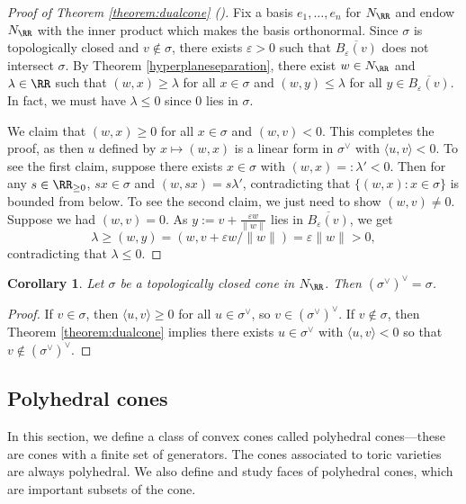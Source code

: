 \documentclass[12pt]{amsart}
\theoremstyle{plain}
\newtheorem{corollary}[theorem]{Corollary}
\theoremstyle{definition}
\begin{document}
\begin{proof}[Proof of Theorem \ref{theorem:dualcone} \textup{(\cite[Example 2.20]{BV04})}]
Fix a basis $e_1, \ldots, e_n$ for $N_\RR$ and endow $N_\RR$ with the inner product which makes the basis orthonormal.
Since $\sigma$ is topologically closed and $v \notin \sigma$, there exists $\varepsilon > 0$ such that $\overline{B_\varepsilon(v)}$ does not intersect $\sigma$.
By Theorem \ref{hyperplaneseparation}, there exist $w \in N_\RR$ and $\lambda \in \RR$ such that $(w, x) \ge \lambda$ for all $x \in \sigma$ and $(w, y) \le \lambda$ for all $y \in \overline{B_\varepsilon(v)}$.
In fact, we must have $\lambda \le 0$ since $0$ lies in $\sigma$.

We claim that $(w, x) \ge 0$ for all $x \in \sigma$ and $(w, v) < 0$.
This completes the proof, as then $u$ defined by $x \mapsto (w, x)$ is a linear form in $\sigma^\vee$ with $\langle u, v \rangle < 0$.
To see the first claim, suppose there exists $x \in \sigma$ with $(w, x) =: \lambda' < 0$.
Then for any $s \in \RR_{\ge 0}$, $s x \in \sigma $ and $(w, s x) = s \lambda'$, contradicting that $\{(w, x) : x \in \sigma\}$ is bounded from below.
To see the second claim, we just need to show $(w, v) \ne 0$.
Suppose we had $(w, v) = 0$.
As $y := v + \frac{\varepsilon w}{\|w\|}$ lies in $\overline{B_\varepsilon(v)}$, we get
$$\lambda \ge (w, y) = (w, v + \varepsilon w/\|w\|) = \varepsilon \|w\| > 0,$$
contradicting that $\lambda \le 0$.
\end{proof}

\begin{corollary}\label{corollary:doubledual}
Let $\sigma$ be a topologically closed cone in $N_\RR$.
Then $(\sigma^\vee)^\vee = \sigma$.
\end{corollary}
\begin{proof}
If $v \in \sigma$, then $\langle u, v\rangle \ge 0$ for all $u \in \sigma^\vee$, so $v \in (\sigma^\vee)^\vee$.
If $v \notin \sigma$, then Theorem \ref{theorem:dualcone} implies there exists $u \in \sigma^\vee$ with $\langle u, v \rangle < 0$ so that $v \notin (\sigma^\vee)^\vee$.
\end{proof}





\subsection{Polyhedral cones}\label{polyhedralcones}
In this section, we define a class of convex cones called polyhedral cones---these are cones with a finite set of generators.
The cones associated to toric varieties are always polyhedral.
We also define and study faces of polyhedral cones, which are important subsets of the cone.
\end{document}
